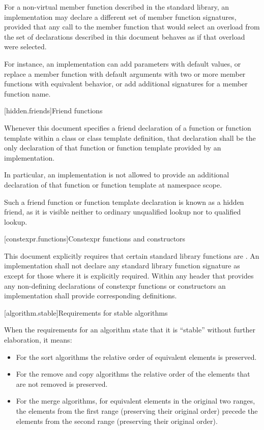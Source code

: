\pnum
For a non-virtual member function described in the \Cpp{} standard library,
an implementation may declare a different set of member function signatures,
provided that any call to the member function that would select
an overload from the set of declarations described in this document
behaves as if that overload were selected.
\begin{note}
For instance, an implementation can add parameters with default values,
or replace a member function with default arguments
with two or more member functions with equivalent behavior,
or add additional signatures for a member function name.
\end{note}

[hidden.friends]{Friend functions}

\pnum
Whenever this document specifies
a friend declaration of a function or function template
within a class or class template definition,
that declaration shall be
the only declaration of that function or function template
provided by an implementation.
\begin{note}
In particular,
an implementation is not allowed to provide
an additional declaration of that function or function template
at namespace scope.
\end{note}
\begin{note}
Such a friend function or function template declaration
is known as a hidden friend,
as it is visible neither
to ordinary unqualified lookup nor
to qualified lookup.
\end{note}

[constexpr.functions]{Constexpr functions and constructors}

\pnum
This document explicitly requires that certain standard library functions are
. An implementation shall not declare
any standard library function signature as  except for those where
it is explicitly required.
Within any header that provides any non-defining declarations of constexpr
functions or constructors an implementation shall provide corresponding definitions.

[algorithm.stable]{Requirements for stable algorithms}

\pnum
{}%
%
When the requirements for an algorithm state that it is ``stable'' without further elaboration,
it means:

\begin{itemize}
\item For the sort algorithms the relative order of equivalent
elements is preserved.

\item For the remove and copy algorithms the relative order of
the elements that are not removed is preserved.

\item For the merge algorithms, for equivalent elements in
the original two ranges, the elements from the first range (preserving their
original order) precede the elements from the second range (preserving their
original order).
\end{itemize}


